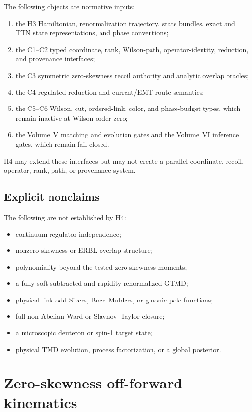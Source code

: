 \documentclass[11pt]{article}
\begin{document}
The following objects are normative inputs:
\begin{enumerate}
\item the H3 Hamiltonian, renormalization trajectory, state bundles, exact and
TTN state representations, and phase conventions;
\item the C1--C2 typed coordinate, rank, Wilson-path, operator-identity,
reduction, and provenance interfaces;
\item the C3 symmetric zero-skewness recoil authority and analytic overlap
oracles;
\item the C4 regulated reduction and current/EMT route semantics;
\item the C5--C6 Wilson, cut, ordered-link, color, and phase-budget types,
which remain inactive at Wilson order zero;
\item the Volume~V matching and evolution gates and the Volume~VI inference
gates, which remain fail-closed.
\end{enumerate}

H4 may extend these interfaces but may not create a parallel coordinate,
recoil, operator, rank, path, or provenance system.

\subsection{Explicit nonclaims}

The following are not established by H4:
\begin{itemize}
\item continuum regulator independence;
\item nonzero skewness or ERBL overlap structure;
\item polynomiality beyond the tested zero-skewness moments;
\item a fully soft-subtracted and rapidity-renormalized GTMD;
\item physical link-odd Sivers, Boer--Mulders, or gluonic-pole functions;
\item full non-Abelian Ward or Slavnov--Taylor closure;
\item a microscopic deuteron or spin-1 target state;
\item physical TMD evolution, process factorization, or a global posterior.
\end{itemize}

\section{Zero-skewness off-forward kinematics}
\label{sec:kinematics}
\end{document}
